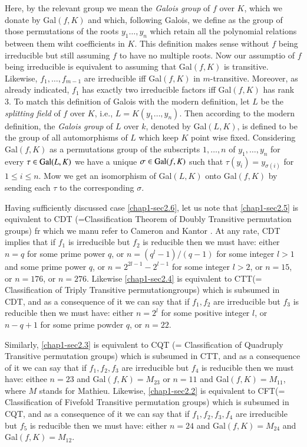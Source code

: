 Here, by the relevant group we mean the {\it Galois group} of $f$ over $K$, which we donate by Gal$(f, K)$ and which, following Galois, we define as the group of those permutations of the roots $y_{1}\ldots, y_{n}$ which retain all the polynomial relations between them wiht coefficients in $K$. This definition makes sense without $f$ being irreducible but still assuming $f$ to have no multiple roots. Now our assumptio of $f$ being irreducible is equivalent to assuming that Gal$(f, K)$ is transitive. Likewise, $f_{1}, \ldots, f_{m-1}$ are irreducible iff Gal$(f, K)$ in $m$-transitive. Moreover, as already indicated, $f_{1}$ has exactly two irreducible factors iff Gal$(f, K)$ has rank 3. To match this definition of Galois with the modern definition, let $L$ be the {\it splitting field} of $f$ over $K$, i.e., $L=K(y_{1}\ldots, y_{n})$. Then according to the modern definition, the {\it Galois group} of $L$ over $k$, denoted by Gal$(L, K)$, is defined to be the group of all automorphisms of $L$ which keep $K$  point wise fixed. Considering Gal$(f, K)$ as a permutations group of the subscripts $1,\ldots, n$ of $y_{1}, \ldots, y_{n}$ for every $\tau \in {\rm Gal}(L, K)$ we have a unique $\sigma \in {\rm Gal}(f, K)$ such that $\tau(y_{i}) = y_{\sigma(i)}$ for $1 \leq i \leq n$. Mow we get an isomorphism of Gal$(L, K)$ onto Gal$(f, K)$ by sending each $\tau$ to the corresponding $\sigma$.

Having sufficiently discussed case \eqref{chap1-sec2.6}, let us note that \eqref{chap1-sec2.5} is equivalent to CDT (=Classification Theorem of Doubly Transitive permutation groups) fr which we manu refer to Cameron \cite{chap1-key22} and Kantor \cite{chap1-key41}. At any rate, CDT implies that if $f_{1}$ is irreducible but $f_{2}$ is reducible then we must have: either $n=q$ for some prime power $q$, or $n=(q^{l}-1)/(q-1)$ for some integer $l>1$ and some prime power $q$, or $n=2^{2l-1}-2^{l-1}$ for some integer $l>2$, or $n=15$, or $n=176$, or $n=276$. Likewise \eqref{chap1-sec2.4} is equivalent to CTT(= Classification of Triply Transitive permutation\pageoriginale groups) which is subsumed in CDT, and as a consequence of it we can say that if $f_{1}, f_{2}$ are irreducible but $f_{3}$ is reducible then we must have: either $n=2^{l}$ for some positive integer $l$, or $n-q+1$ for some prime powder $q$, or $n=22$.
       
Similarly, \eqref{chap1-sec2.3} is equivalent to CQT (= Classification of Quadruply Transitive permutation groups) which is subsumed in CTT, and as a consequence of it we can  say that if $f_{1}, f_{2}, f_{3}$ are irreducible but $f_{4}$ is reducible then we must have: eithee $n=23$ and Gal$(f, K)=M_{23}$ or $n=11$ and Gal$(f, K)=M_{11}$, where  $M$ stands for Mathieu. Likewise, \eqref{chap1-sec2.2} is equivalent to CFT(= Classification of Fivefold Transitive permutation groups) which is subsumed in CQT, and as a consequence of it we can say that if $f_{1},f_{2}, f_{3}, f_{4}$ are irreducible but $f_{5}$ is reducible then we must have: either $n=24$ and Gal$(f, K)=M_{24}$ and Gal$(f, K)=M_{12}$.  

